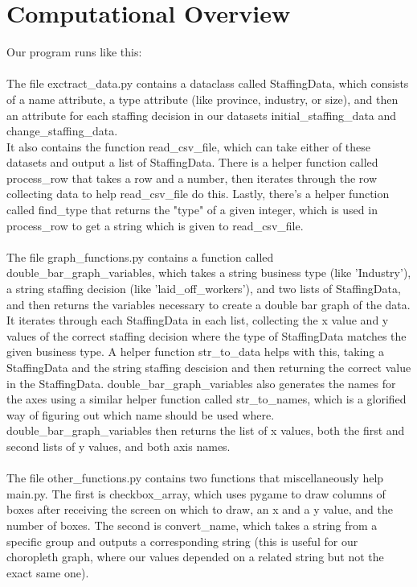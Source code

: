 \documentclass[fontsize=11pt]{article}
\begin{document}
    \section*{Computational Overview}

    Our program runs like this:
    \\
    \\
    The file exctract\_data.py contains a dataclass called StaffingData, which consists of a name attribute, a type attribute (like province, industry, or size), and then an attribute for each staffing decision in our datasets initial\_staffing\_data and change\_staffing\_data.
    \\
    It also contains the function read\_csv\_file, which can take either of these datasets and output a list of StaffingData. There is a helper function called process\_row that takes a row and a number, then iterates through the row collecting data to help read\_csv\_file do this. Lastly, there's a helper function called find\_type that returns the "type" of a given integer, which is used in process\_row to get a string which is given to read\_csv\_file.
    \\
    \\
    The file graph\_functions.py contains a function called double\_bar\_graph\_variables, which takes a string business type (like 'Industry'), a string staffing decision (like 'laid\_off\_workers'), and two lists of StaffingData, and then returns the variables necessary to create a double bar graph of the data. It iterates through each StaffingData in each list, collecting the x value and y values of the correct staffing decision where the type of StaffingData matches the given business type. A helper function str\_to\_data helps with this, taking a StaffingData and the string staffing descision and then returning the correct value in the StaffingData. double\_bar\_graph\_variables also generates the names for the axes using a similar helper function called str\_to\_names, which is a glorified way of figuring out which name should be used where. double\_bar\_graph\_variables then returns the list of x values, both the first and second lists of y values, and both axis names.
    \\
    \\
    The file other\_functions.py contains two functions that miscellaneously help main.py. The first is checkbox\_array, which uses pygame to draw columns of boxes after receiving the screen on which to draw, an x and a y value, and the number of boxes. The second is convert\_name, which takes a string from a specific group and outputs a corresponding string (this is useful for our choropleth graph, where our values depended on a related string but not the exact same one).
\end{document}
